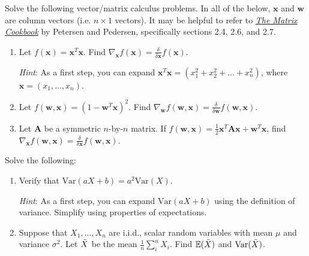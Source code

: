 \documentclass{harvardml}
\theoremstyle{definition}
\theoremstyle{plain}
\newcommand{\E}{\mathbb{E}}
\newcommand{\var}{\text{Var}}
\begin{document}
\begin{problem} 
		    Solve the following vector/matrix calculus problems. In all of the below, $\mathbf{x}$ and $\mathbf{w}$ are column vectors (i.e. $n \times 1$ vectors).  It may be helpful to refer to \href{https://www.math.uwaterloo.ca/~hwolkowi/matrixcookbook.pdf}{\emph{The Matrix Cookbook}} by Petersen and Pedersen, specifically sections 2.4, 2.6, and 2.7.
		    
		    \begin{enumerate} [label=(\alph*)]
		        \item Let $f(\mathbf{x}) = \mathbf{x}^T \mathbf{x}$. Find $\nabla_{\mathbf{x}} f(\mathbf{x}) = \frac{\delta}{\delta \mathbf{x}} f(\mathbf{x})$.
		        
		        \emph{Hint}: As a first step, you can expand $\mathbf{x}^T \mathbf{x} = (x_1^2 + x_2^2 + ... + x_n^2)$, where $\mathbf{x} = (x_1, ..., x_n)$. 
		        
		        \item Let $f(\mathbf{w},\mathbf{x}) = (1 - \mathbf{w}^T \mathbf{x})^2$. Find $\nabla_{\mathbf{w}} f(\mathbf{w},\mathbf{x}) = \frac{\delta}{\delta \mathbf{w}} f(\mathbf{w},\mathbf{x})$.
		        
		        \item Let $\mathbf{A}$ be a symmetric $n$-by-$n$ matrix. If $f(\mathbf{w},\mathbf{x}) = \frac{1}{2}\mathbf{x}^T \mathbf{A} \mathbf{x} + \mathbf{w}^T \mathbf{x}$, find $\nabla_{\mathbf{x}} f(\mathbf{w},\mathbf{x}) = \frac{\delta}{\delta \mathbf{x}} f(\mathbf{w},\mathbf{x})$.
		        \end{enumerate}
		\end{problem}

\begin{problem} Solve the following: 
\begin{enumerate} [label=(\alph*)] 
\item Verify that $\var(aX + b) = a^2\var(X)$.

\emph{Hint}: As a first step, you can expand $\var(aX + b)$ using the definition of variance.  Simplify using properties of expectations.
\item Suppose that $X_1, ..., X_n$ are i.i.d., scalar random variables with mean $\mu$ and variance $\sigma^2$. Let $\Bar{X}$ be the mean $\frac{1}{n}\sum_i^n X_i$. Find $\E(\Bar{X})$ and $\var(\Bar{X})$.
\end{enumerate}
\end{problem}
		
\end{document}
